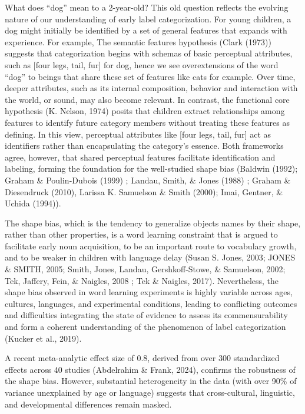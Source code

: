 \documentclass[10pt, letterpaper]{article}
\begin{document}
What does ``dog'' mean to a 2-year-old? This old question reflects the
evolving nature of our understanding of early label categorization. For
young children, a dog might initially be identified by a set of general
features that expands with experience. For example, The semantic
features hypothesis (Clark (1973)) suggests that categorization begins
with schemas of basic perceptual attributes, such as {[}four legs, tail,
fur{]} for dog, hence we see overextensions of the word ``dog'' to
beings that share these set of features like cats for example. Over
time, deeper attributes, such as its internal composition, behavior and
interaction with the world, or sound, may also become relevant. In
contrast, the functional core hypothesis (K. Nelson, 1974) posits that
children extract relationships among features to identify future
category members without treating these features as defining. In this
view, perceptual attributes like {[}four legs, tail, fur{]} act as
identifiers rather than encapsulating the category's essence. Both
frameworks agree, however, that shared perceptual features facilitate
identification and labeling, forming the foundation for the well-studied
shape bias (Baldwin (1992); Graham \& Poulin-Dubois (1999) ; Landau,
Smith, \& Jones (1988) ; Graham \& Diesendruck (2010), Larissa K.
Samuelson \& Smith (2000); Imai, Gentner, \& Uchida (1994)).

The shape bias, which is the tendency to generalize objects names by
their shape, rather than other properties, is a word learning constraint
that is argued to facilitate early noun acquisition, to be an important
route to vocabulary growth, and to be weaker in children with language
delay (Susan S. Jones, 2003; JONES \& SMITH, 2005; Smith, Jones, Landau,
Gershkoff-Stowe, \& Samuelson, 2002; Tek, Jaffery, Fein, \& Naigles,
2008 ; Tek \& Naigles, 2017). Nevertheless, the shape bias observed in
word learning experiments is highly variable across ages, cultures,
languages, and experimental conditions, leading to conflicting outcomes
and difficulties integrating the state of evidence to assess its
commensurability and form a coherent understanding of the phenomenon of
label categorization (Kucker et al., 2019).

A recent meta-analytic effect size of 0.8, derived from over 300
standardized effects across 40 studies (Abdelrahim \& Frank, 2024),
confirms the robustness of the shape bias. However, substantial
heterogeneity in the data (with over 90\% of variance unexplained by age
or language) suggests that cross-cultural, linguistic, and developmental
differences remain masked.
\end{document}
